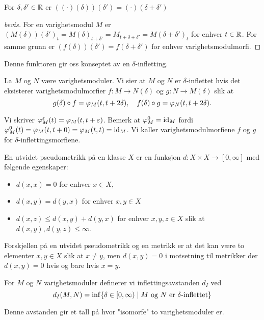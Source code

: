\begin{korollar}\label{kor:Shiftpluss}
For $\delta,\delta'\in\mathbb{R}$ er $((\cdot)(\delta))(\delta')=(\cdot)(\delta+\delta')$
\end{korollar}
\begin{proof}[bevis]
For en varighetsmodul $M$ er $(M(\delta))(\delta')_t=M(\delta)_{t+\delta'}=M_{t+\delta+\delta'}=M(\delta+\delta')_t$ for enhver $t\in\mathbb{R}$. For samme grunn er $(f(\delta))(\delta')=f(\delta+\delta'
)$ for enhver varighetsmodulmorfi.
\end{proof}

Denne funktoren gir oss konseptet av en $\delta$-infletting.

\begin{definisjon}\label{Def:infletting}
	La $M$ og $N$ være varighetsmoduler. Vi sier at $M$ og $N$ er $\delta$-inflettet hvis det eksisterer varighetsmodulmorfier $f:M\to N(\delta)$ og $g:N\to M(\delta)$ slik at
	\[g(\delta)\circ f = \varphi_M(t,t+2\delta),\quad f(\delta)\circ g = \varphi_N(t,t+2\delta).\]
\end{definisjon}
Vi skriver $\varphi^\varepsilon_M(t) = \varphi_M(t,t+\varepsilon)$. Bemerk at $\varphi^0_M=\textnormal{id}_M$ fordi $\varphi^0_M(t) = \varphi_M(t,t+0)=\varphi_M(t,t)=\textnormal{id}_M$. Vi kaller varighetsmodulmorfiene $f$ og $g$ for $\delta$-inflettingsmorfiene.

\begin{definisjon}\label{def:UtPsMet}
   En utvidet pseudometrikk på en klasse $X$ er en
   funksjon $d: X\times X\to [0,\infty]$ med følgende
   egenskaper:
   \begin{itemize}
     \item $d(x,x) = 0$ for enhver $x\in X$,
     \item $d(x,y) = d(y,x)$ for enhver $x,y\in X$
     \item $d(x,z) \leq d(x,y) + d(y,x)$ for enhver
       $x,y,z\in X$ slik at $d(x,y),d(y,z)\leq\infty$.
   \end{itemize}
\end{definisjon}

Forskjellen på en utvidet pseudometrikk og en metrikk er
at det kan være to elementer $x,y\in X$ slik at $x\neq y$,
men $d(x,y)=0$ i motsetning til metrikker der $d(x,y)=0$
hvis og bare hvis $x=y$.

\begin{definisjon}\label{Def:InfAvs}
	For $M$ og $N$ varighetsmoduler definerer vi inflettingsavstanden $d_I$ ved
	\[d_I(M,N) = \inf\{\delta\in [0,\infty)\mid \text{$M$ og $N$ er $\delta$-inflettet}\}\]
\end{definisjon}
Denne avstanden gir et tall på hvor "isomorfe" to varighetsmoduler er.


